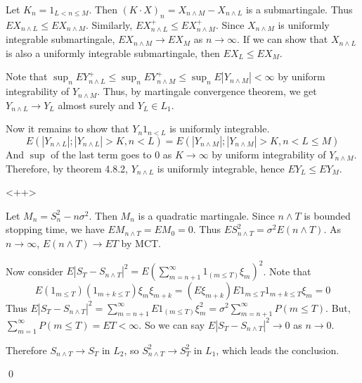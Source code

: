 \begin{problem}[4.8.1]\hfill

	Let $K_n = 1_{L < n \leq M}$. Then $(K\cdot X)_n = X_{n\wedge M} - X_{n\wedge L}$ is a submartingale.
	Thus $EX_{n\wedge L} \leq EX_{n\wedge M}$.
	Similarly, $EX_{n\wedge L}^+ \leq EX_{n\wedge M}^+$.
	Since $X_{n \wedge M}$ is uniformly integrable submartingale, $EX_{n\wedge M} \rightarrow EX_{M}$ as $n\rightarrow \infty$.
	If we can show that $X_{n\wedge L}$ is also a uniformly integrable submartingale, then $EX_L \leq EX_M$.

	Note that $\sup_n EY_{n\wedge L}^+ \leq \sup_n EY_{n\wedge M}^+ \leq \sup_n E|Y_{n\wedge M}| < \infty$ by uniform integrability of $Y_{n\wedge M}$.
	Thus, by martingale convergence theorem, we get $Y_{n\wedge L} \rightarrow Y_L$ almost surely and $Y_L \in L_1$.

	Now it remains to show that $Y_n 1_{n < L}$ is uniformly integrable.
	\[
		E(|Y_{n\wedge L}|;|Y_{n\wedge L}|>K, n<L) = E\left( |Y_{n\wedge M}|; |Y_{n\wedge M}|>K, n<L\leq M \right)
	\]
	And $\sup$ of the last term goes to $0$ as $K \rightarrow \infty$ by uniform integrability of $Y_{n\wedge M}$.
	Therefore, by theorem 4.8.2, $Y_{n\wedge L}$ is uniformly integrable, hence $EY_L \leq EY_M$.


	
\end{problem}<++>
\begin{problem}[4.8.4] \hfill

	Let $M_n = S_n ^2 - n\sigma^2$. Then $M_n$ is a quadratic martingale.
	Since $n\wedge T$ is bounded stopping time, we have $EM_{n\wedge T} = EM_0 = 0$.
	Thus $ES_{n\wedge T}^2 = \sigma^2 E(n\wedge T)$.
	As $n\rightarrow \infty$, $E(n\wedge T) \rightarrow ET$ by MCT.

	Now consider $E|S_T - S_{n \wedge T}|^2 = E\left( \sum_{m = n+1}^\infty 1_{(m \leq T)} \xi_m \right)^2$.
	Note that 
	\[
		E (1_{m \leq T}) (1_{m+k \leq T}) \xi_m \xi_{m+k} = (E\xi_{m+k})E1_{m\leq T}1_{m+k\leq T}\xi_m = 0
	\]
	Thus $E|S_T - S_{n\wedge T}|^2 = \sum_{m=n+1}^\infty E1_{(m\leq T)}\xi_m^2 = \sigma^2 \sum_{m=n+1}^\infty P(m\leq T)$.
	But, $\sum_{m=1}^\infty P(m\leq T) = ET <\infty$.
	So we can say $E|S_T - S_{n \wedge T}|^2 \rightarrow 0$ as $n\rightarrow 0$.
	
	Therefore $S_{n\wedge T} \rightarrow S_T$ in $L_2$, so $S_{n\wedge T}^2 \rightarrow S_T^2$ in $L_1$, which leads the conclusion.

	\qed

\end{problem}

